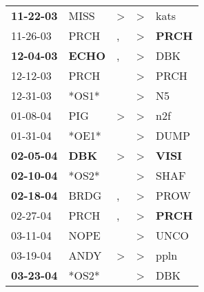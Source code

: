 \begin{supertabular}{p{0.07\textwidth}p{0.06\textwidth}p{0.02\textwidth}p{0.02\textwidth}p{0.06\textwidth}}
 \textbf{11-22-03\textsuperscript{}} &           MISS\textsuperscript{} &     \textgreater &     \textgreater &           kats\textsuperscript{} \\
          11-26-03\textsuperscript{} &           PRCH\textsuperscript{} &                , &     \textgreater &  \textbf{PRCH\textsuperscript{}} \\
 \textbf{12-04-03\textsuperscript{}} &  \textbf{ECHO\textsuperscript{}} &                , &     \textgreater &            DBK\textsuperscript{} \\
          12-12-03\textsuperscript{} &           PRCH\textsuperscript{} &                  &     \textgreater &           PRCH\textsuperscript{} \\
          12-31-03\textsuperscript{} &                            *OS1* &                  &     \textgreater &             N5\textsuperscript{} \\
          01-08-04\textsuperscript{} &            PIG\textsuperscript{} &     \textgreater &     \textgreater &            n2f\textsuperscript{} \\
          01-31-04\textsuperscript{} &                            *OE1* &                  &     \textgreater &           DUMP\textsuperscript{} \\
 \textbf{02-05-04\textsuperscript{}} &   \textbf{DBK\textsuperscript{}} &     \textgreater &     \textgreater &  \textbf{VISI\textsuperscript{}} \\
 \textbf{02-10-04\textsuperscript{}} &                            *OS2* &                  &     \textgreater &           SHAF\textsuperscript{} \\
 \textbf{02-18-04\textsuperscript{}} &           BRDG\textsuperscript{} &                , &     \textgreater &           PROW\textsuperscript{} \\
          02-27-04\textsuperscript{} &           PRCH\textsuperscript{} &                , &     \textgreater &  \textbf{PRCH\textsuperscript{}} \\
          03-11-04\textsuperscript{} &           NOPE\textsuperscript{} &                  &     \textgreater &           UNCO\textsuperscript{} \\
          03-19-04\textsuperscript{} &           ANDY\textsuperscript{} &     \textgreater &     \textgreater &           ppln\textsuperscript{} \\
 \textbf{03-23-04\textsuperscript{}} &                            *OS2* &                  &     \textgreater &            DBK\textsuperscript{} \\

\end{supertabular}
